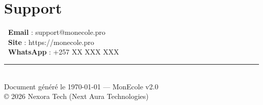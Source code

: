 \documentclass[11pt,a4paper,oneside]{book}
\begin{document}
\section{Support}
\begin{center}
\begin{tcolorbox}[enhanced, colback=primaryDark!5, colframe=primaryDark, arc=8pt, width=0.65\textwidth]
\centering
\textbf{\faEnvelope~Email} : support@monecole.pro \\[4pt]
\textbf{\faGlobe~Site} : https://monecole.pro \\[4pt]
\textbf{\faWhatsapp~WhatsApp} : +257 XX XXX XXX
\end{tcolorbox}
\end{center}

\vfill
\begin{center}
\textcolor{grayMid}{\rule{0.5\textwidth}{0.5pt}}\\[6pt]
\textcolor{grayMid}{\small Document g\'{e}n\'{e}r\'{e} le \today{} --- MonEcole v2.0}\\
\textcolor{grayMid}{\small \copyright{} 2026 Nexora Tech (Next Aura Technologies)}
\end{center}
\end{document}
